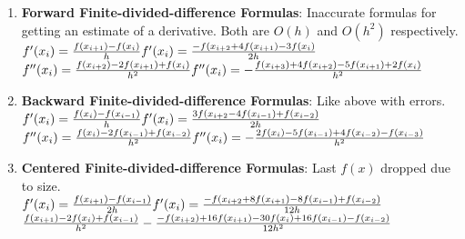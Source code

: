\documentclass[fontsize=5pt]{scrartcl}
\begin{document}
\begin{multicols}{3}
\begin{enumerate}
        \item \textbf{Forward Finite-divided-difference Formulas}: Inaccurate formulas for getting an estimate
          of a derivative. Both are $O(h)$ and $O(h^2)$ respectively.\\
        \begin{math}
          f'(x_i)=\frac{f(x_{i+1})-f(x_i)}{h}\\
          f'(x_i)=\frac{-f(x_{i+2}+4f(x_{i+1})-3f(x_i)}{2h}\\
        \end{math} \\
        \begin{math}
          f''(x_i)=\frac{f(x_{i+2})-2f(x_{i+1})+f(x_i)}{h^2} \\
          f''(x_i)=-\frac{f(x_{i+3})+4f(x_{i+2})-5f(x_{i+1})+2f(x_i)}{h^2} \\
        \end{math} \\
        
        \item \textbf{Backward Finite-divided-difference Formulas}: Like above with errors. \\
        \begin{math}
          f'(x_i)=\frac{f(x_{i})-f(x_{i-1})}{h}\\
          f'(x_i)=\frac{3f(x_{i+2}-4f(x_{i-1})+f(x_{i-2})}{2h}\\
        \end{math} \\
        \begin{math}
          f''(x_i)=\frac{f(x_i)-2f(x_{i-1})+f(x_{i-2})}{h^2} \\
          f''(x_i)=-\frac{2f(x_i)-5f(x_{i-1})+4f(x_{i-2})-f(x_{i-3})}{h^2}
        \end{math}

        \item \textbf{Centered Finite-divided-difference Formulas}: Last $f(x)$ dropped due to size. \\
        \begin{math}
          f'(x_i)=\frac{f(x_{i+1})-f(x_{i-1})}{2h}\\
          f'(x_i)=\frac{-f(x_{i+2}+8f(x_{i+1})-8f(x_{i-1})+f(x_{i-2})}{12h}\\
        \end{math} \\
        \begin{math}
          \frac{f(x_{i+1})-2f(x_i)+f(x_{i-1})}{h^2} \\
          -\frac{-f(x_{i+2})+16f(x_{i+1})-30f(x_i)+16f(x_{i-1})-f(x_{i-2})}{12h^2}
        \end{math}


\end{enumerate}
\end{multicols}
\end{document}
